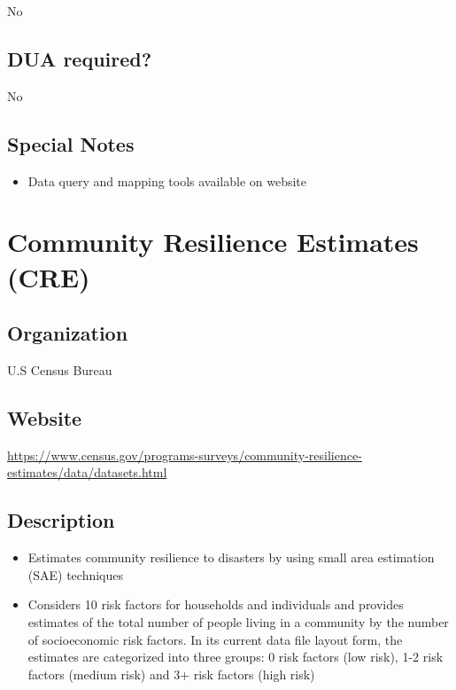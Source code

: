 \documentclass[
]{book}
\providecommand{\tightlist}{%
  \setlength{\itemsep}{0pt}\setlength{\parskip}{0pt}}
\begin{document}
No

\hypertarget{dua-required-17}{%
\section{DUA required?}\label{dua-required-17}}

No

\hypertarget{special-notes-17}{%
\section{Special Notes}\label{special-notes-17}}

\begin{itemize}
\tightlist
\item
  Data query and mapping tools available on website
\end{itemize}

\mainmatter

\hypertarget{community-resilience-estimates-cre}{%
\chapter{Community Resilience Estimates (CRE)}\label{community-resilience-estimates-cre}}

\hypertarget{organization-18}{%
\section{Organization}\label{organization-18}}

U.S Census Bureau

\hypertarget{website-18}{%
\section{Website}\label{website-18}}

\url{https://www.census.gov/programs-surveys/community-resilience-estimates/data/datasets.html}

\hypertarget{description-18}{%
\section{Description}\label{description-18}}

\begin{itemize}
\tightlist
\item
  Estimates community resilience to disasters by using small area estimation (SAE) techniques
\item
  Considers 10 risk factors for households and individuals and provides estimates of the total number of people living in a community by the number of socioeconomic risk factors. In its current data file layout form, the estimates are categorized into three
  groups: 0 risk factors (low risk), 1-2 risk factors (medium risk) and 3+ risk factors (high risk)
\end{itemize}
\end{document}
